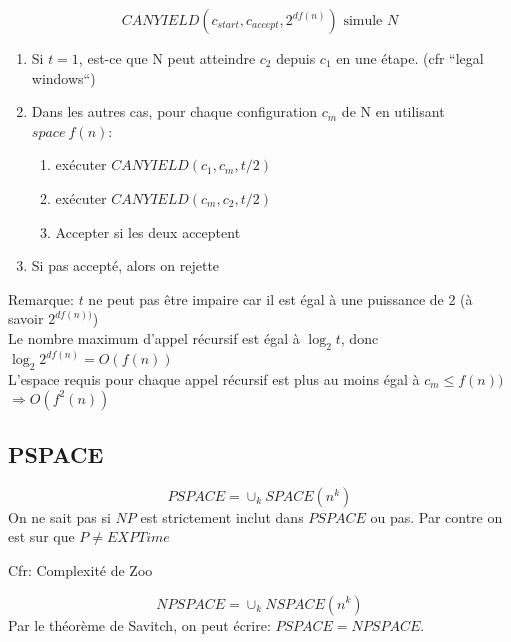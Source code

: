 \documentclass[a4paper,12pt]{article}
\begin{document}
    $$CANYIELD(c_{start}, c_{accept}, 2^{df(n)}) \text{ simule } N$$  %
    \begin{enumerate}
      \item Si $t = 1$, est-ce que N peut atteindre $c_2$ depuis $c_1$ en une étape.  (cfr ``legal windows``)
      \item Dans les autres cas, pour chaque configuration $c_m$ de N en utilisant $space\ f(n)$:
	\begin{enumerate}
	  \item exécuter $CANYIELD(c_1, c_m, t/2)$
	  \item exécuter $CANYIELD(c_m, c_2, t/2)$
	  \item Accepter si les deux acceptent
	\end{enumerate}
      \item Si pas accepté, alors on rejette
    \end{enumerate}
    Remarque: $t$ ne peut pas être impaire car il est égal à une puissance de 2 (à savoir $2^{df(n))}$)\\

    Le nombre maximum d'appel récursif est égal à $\log_2 t$, donc $\log_2 2^{df(n)} = O(f(n))$\\
    L'espace requis pour chaque appel récursif est plus au moins égal à $c_m \leq f(n))$\\
    $\Rightarrow O(f^2(n))$


  \subsection{PSPACE}
    $$PSPACE = \cup_{k} SPACE(n^k)$$
    On ne sait pas si $NP$ est strictement inclut dans $PSPACE$ ou pas.  Par contre on est sur que $P \neq EXPTime$

    Cfr: Complexité de Zoo

    $$NPSPACE = \cup_{k} NSPACE(n^k)$$
    Par le théorème de Savitch, on peut écrire: $PSPACE = NPSPACE$.
\end{document}
